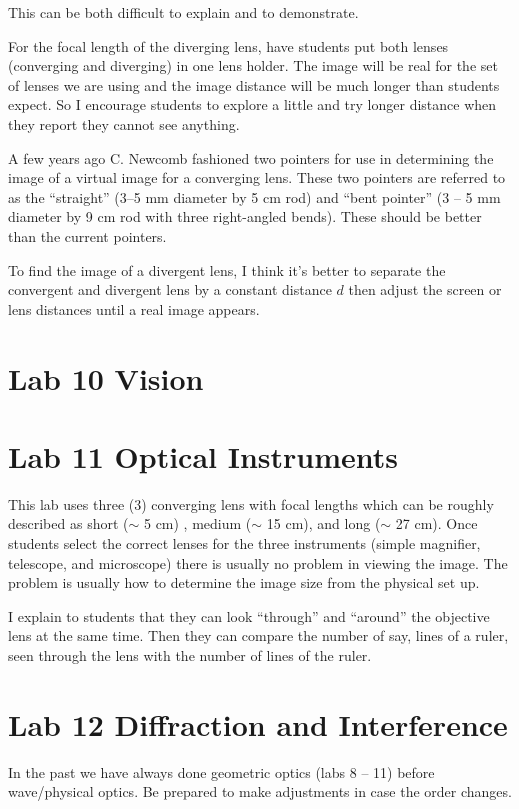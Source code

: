 This can be both difficult to explain and to demonstrate. %

For the focal length of the diverging lens, have students put both lenses (converging and diverging) in one lens holder. The image will be real for the set of lenses we are using and the image distance will be much longer than students expect. So I encourage students to explore a little and try longer distance when they report they cannot see anything.


A few years ago C. Newcomb fashioned two pointers for use in determining the image of a virtual image for a converging lens. These two pointers are referred to as the ``straight'' (3--5 mm diameter by 5 cm rod) and ``bent pointer'' (3 -- 5 mm diameter by 9 cm rod with three right-angled bends). These should be better than the current pointers.

To find the image of a divergent lens,  I think it's better to separate the convergent and divergent lens by a constant distance $d$ then adjust the screen or lens distances until a real image appears. 

\section{Lab 10 Vision}
\section{Lab 11 Optical Instruments}

This lab uses three (3) converging lens with focal lengths which can be roughly described as short ($\sim$ 5 cm) , medium ($\sim$ 15 cm), and long ($\sim$ 27 cm).  Once students select the correct lenses for the three instruments (simple magnifier, telescope, and microscope) there is usually no problem in viewing the image. The problem is usually how to determine the image size from the physical set up.

I explain to students that they can look ``through'' and ``around'' the objective  lens at the same time. Then they can compare the number of say, lines of a ruler, seen through the lens with the number of lines of the ruler.

\section{Lab 12 Diffraction and Interference}
In the past we have always done geometric optics (labs 8 -- 11) before wave/physical optics. Be prepared to make adjustments in case the order changes.

